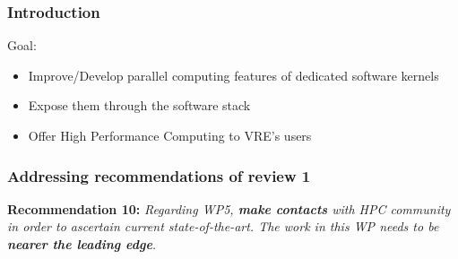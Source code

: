 \documentclass{beamer}
\begin{document}
\begin{frame}
  \frametitle{Introduction}
  \begin{block}
    {Goal:}
    \begin{itemize}
    \item Improve/Develop parallel computing features of dedicated software
      kernels
    \item Expose them through the software stack
    \item Offer High Performance Computing to VRE's users
    \end{itemize}
  \end{block}
\end{frame}
\begin{frame}
\frametitle{Addressing recommendations of review 1}
    \textbf{Recommendation 10:} \textit{Regarding WP5, \textbf{make contacts} with HPC community in order to ascertain current state-of-the-art. The work in this WP needs to be \textbf{nearer the leading edge}.}


\end{frame}
\end{document}
